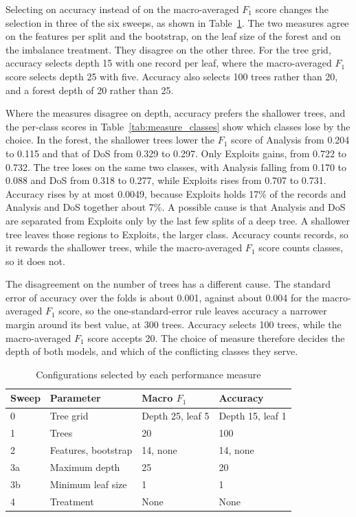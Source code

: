 \documentclass[conference,10pt]{IEEEtran}
\begin{document}
Selecting on accuracy instead of on the macro-averaged $F_1$ score changes
the selection in three of the six sweeps, as shown in Table~\ref{tab:measure}. The two
measures agree on the features per split and the bootstrap, on the leaf
size of the forest and on the imbalance treatment. They disagree on the other three. For the tree grid,
accuracy selects depth 15 with one record per leaf, where the
macro-averaged $F_1$ score selects depth 25 with five. Accuracy also
selects 100 trees rather than 20, and a forest depth of 20 rather than 25.

Where the measures disagree on depth, accuracy prefers the shallower trees,
and the per-class scores in Table~\ref{tab:measure_classes} show which
classes lose by the choice. In the
forest, the shallower trees lower the $F_1$ score of Analysis from 0.204 to
0.115 and that of DoS from 0.329 to 0.297. Only Exploits gains, from 0.722
to 0.732. The tree loses on the same two classes, with
Analysis falling from 0.170 to 0.088 and DoS from 0.318 to 0.277, while
Exploits rises from 0.707 to 0.731. Accuracy rises by at most 0.0049,
because Exploits holds 17\% of the records and Analysis and DoS together
about 7\%. A possible cause is that Analysis and DoS are separated from
Exploits only by the last few splits of a deep tree. A shallower tree
leaves those regions to Exploits, the larger class. Accuracy counts
records, so it rewards the shallower trees, while the macro-averaged $F_1$ score
counts classes, so it does not.

The disagreement on the number of trees has a different cause. The
standard error of accuracy over the folds is about 0.001, against about
0.004 for the macro-averaged $F_1$ score, so the one-standard-error rule
leaves accuracy a narrower margin around its best value, at 300 trees.
Accuracy selects 100 trees, while the macro-averaged $F_1$ score
accepts 20. The choice of measure therefore decides the depth of both
models, and which of the conflicting classes they serve.

\begin{table}[t]
  \centering
  \caption{Configurations selected by each performance measure}
  \label{tab:measure}
  \begin{tabular}{llll}
    \toprule
    Sweep & Parameter & Macro $F_1$ & Accuracy \\
    \midrule
    0  & Tree grid & Depth 25, leaf 5 & Depth 15, leaf 1 \\
    1  & Trees & 20 & 100 \\
    2  & Features, bootstrap & 14, none & 14, none \\
    3a & Maximum depth & 25 & 20 \\
    3b & Minimum leaf size & 1 & 1 \\
    4  & Treatment & None & None \\
    \bottomrule
  \end{tabular}
\end{table}
\end{document}
